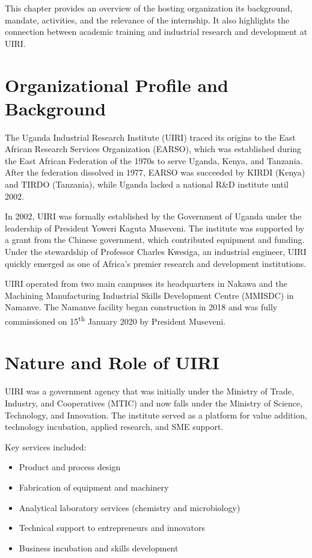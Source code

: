 \documentclass[12pt,a4paper]{report}
\begin{document}
\noindent This chapter provides an overview of the hosting organization its background, mandate, activities, and the relevance of the internship. It also highlights the connection between academic training and industrial research and development at UIRI.

\section{Organizational Profile and Background}
\noindent The Uganda Industrial Research Institute (UIRI) traced its origins to the East African Research Services Organization (EARSO), which was established during the East African Federation of the 1970s to serve Uganda, Kenya, and Tanzania. After the federation dissolved in 1977, EARSO was succeeded by KIRDI (Kenya) and TIRDO (Tanzania), while Uganda lacked a national R\&D institute until 2002.

\noindent In 2002, UIRI was formally established by the Government of Uganda under the leadership of President Yoweri Kaguta Museveni. The institute was supported by a grant from the Chinese government, which contributed equipment and funding. Under the stewardship of Professor Charles Kwesiga, an industrial engineer, UIRI quickly emerged as one of Africa's premier research and development institutions.

\noindent UIRI operated from two main campuses its headquarters in Nakawa and the Machining Manufacturing Industrial Skills Development Centre (MMISDC) in Namanve. The Namanve facility began construction in 2018 and was fully commissioned on 15\textsuperscript{th} January 2020 by President Museveni.

\section{Nature and Role of UIRI}
\noindent UIRI was a government agency that was initially under the Ministry of Trade, Industry, and Cooperatives (MTIC) and now falls under the Ministry of Science, Technology, and Innovation. The institute served as a platform for value addition, technology incubation, applied research, and SME support.

\noindent Key services included:
\begin{itemize}
    \item Product and process design
    \item Fabrication of equipment and machinery
    \item Analytical laboratory services (chemistry and microbiology)
    \item Technical support to entrepreneurs and innovators
    \item Business incubation and skills development
\end{itemize}
\end{document}
